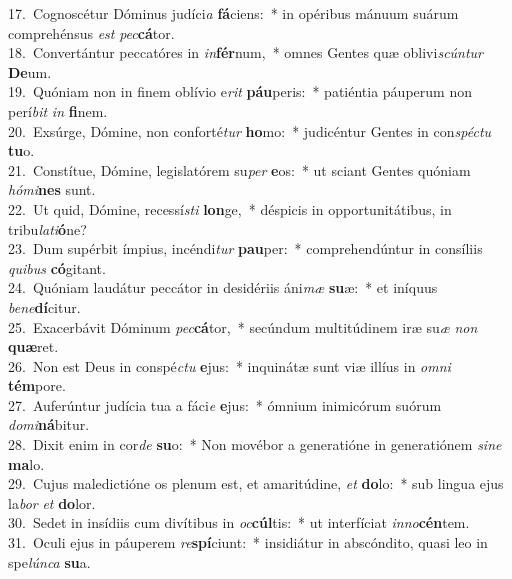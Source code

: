 {17.~}Cognoscétur Dóminus judíci\textit{a} \textbf{fá}ciens:~* in opéribus mánuum suárum comprehénsus \textit{est} \textit{pec}\textbf{cá}tor.\\
{18.~}Convertántur peccatóres in \textit{in}\textbf{fér}num,~* omnes Gentes quæ oblivi\textit{scún}\textit{tur} \textbf{De}um.\\
{19.~}Quóniam non in finem oblívio e\textit{rit} \textbf{páu}peris:~* patiéntia páuperum non perí\textit{bit} \textit{in} \textbf{fi}nem.\\
{20.~}Exsúrge, Dómine, non conforté\textit{tur} \textbf{ho}mo:~* judicéntur Gentes in con\textit{spé}\textit{ctu} \textbf{tu}o.\\
{21.~}Constítue, Dómine, legislatórem su\textit{per} \textbf{e}os:~* ut sciant Gentes quóniam \textit{hó}\textit{mi}\textbf{nes} sunt.\\
{22.~}Ut quid, Dómine, recessí\textit{sti} \textbf{lon}ge,~* déspicis in opportunitátibus, in tribu\textit{la}\textit{ti}\textbf{ó}ne?\\
{23.~}Dum supérbit ímpius, incéndi\textit{tur} \textbf{pau}per:~* comprehendúntur in consíliis \textit{qui}\textit{bus} \textbf{có}gitant.\\
{24.~}Quóniam laudátur peccátor in desidériis áni\textit{mæ} \textbf{su}æ:~* et iníquus \textit{be}\textit{ne}\textbf{dí}citur.\\
{25.~}Exacerbávit Dóminum \textit{pec}\textbf{cá}tor,~* secúndum multitúdinem iræ su\textit{æ} \textit{non} \textbf{quæ}ret.\\
{26.~}Non est Deus in conspé\textit{ctu} \textbf{e}jus:~* inquinátæ sunt viæ illíus in \textit{om}\textit{ni} \textbf{tém}pore.\\
{27.~}Auferúntur judícia tua a fáci\textit{e} \textbf{e}jus:~* ómnium inimicórum suórum \textit{do}\textit{mi}\textbf{ná}bitur.\\
{28.~}Dixit enim in cor\textit{de} \textbf{su}o:~* Non movébor a generatióne in generatiónem \textit{si}\textit{ne} \textbf{ma}lo.\\
{29.~}Cujus maledictióne os plenum est, et amaritúdine, \textit{et} \textbf{do}lo:~* sub lingua ejus la\textit{bor} \textit{et} \textbf{do}lor.\\
{30.~}Sedet in insídiis cum divítibus in \textit{oc}\textbf{cúl}tis:~* ut interfíciat \textit{in}\textit{no}\textbf{cén}tem.\\
{31.~}Oculi ejus in páuperem \textit{re}\textbf{spí}ciunt:~* insidiátur in abscóndito, quasi leo in spe\textit{lún}\textit{ca} \textbf{su}a.\\
